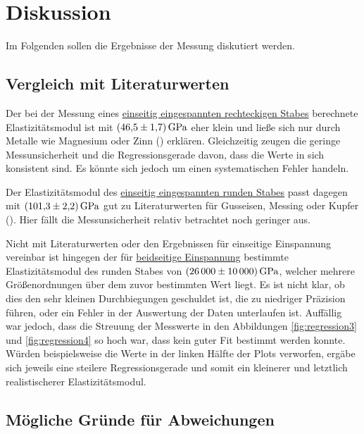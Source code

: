 \section{Diskussion}

Im Folgenden sollen die Ergebnisse der Messung diskutiert werden.

\subsection{Vergleich mit Literaturwerten}

Der bei der Messung eines \hyperref[sec:auswertung_einseitig_rechteckig]{einseitig eingespannten rechteckigen Stabes} berechnete Elastizitätsmodul ist mit $\SI{46.5 \pm 1.7}{\giga\pascal}$ eher klein und ließe sich nur durch Metalle wie Magnesium oder Zinn (\cite{e_moduln_tabelle}) erklären. Gleichzeitig zeugen die geringe Messunsicherheit und die Regressionsgerade davon, dass die Werte in sich konsistent sind. Es könnte sich jedoch um einen systematischen Fehler handeln.

Der Elastizitätsmodul des \hyperref[sec:auswertung_einseitig_rund]{einseitig eingespannten runden Stabes} passt dagegen mit $\SI{101.3 \pm 2.2}{\giga\pascal}$ gut zu Literaturwerten für Gusseisen, Messing oder Kupfer (\cite{e_moduln_tabelle}). Hier fällt die Messunsicherheit relativ betrachtet noch geringer aus.

Nicht mit Literaturwerten oder den Ergebnissen für einseitige Einspannung vereinbar ist hingegen der für \hyperref[sec:auswertung_beidseitig_rund]{beidseitige Einspannung} bestimmte Elastizitätsmodul des runden Stabes von $\SI{26000 \pm 10000}{\giga\pascal}$, welcher mehrere Größenordnungen über dem zuvor bestimmten Wert liegt. Es ist nicht klar, ob dies den sehr kleinen Durchbiegungen geschuldet ist, die zu niedriger Präzision führen, oder ein Fehler in der Auswertung der Daten unterlaufen ist. Auffällig war jedoch, dass die Streuung der Messwerte in den Abbildungen \ref{fig:regression3} und \ref{fig:regression4} so hoch war, dass kein guter Fit bestimmt werden konnte. Würden beispielsweise die Werte in der linken Hälfte der Plots verworfen, ergäbe sich jeweils eine steilere Regressionsgerade und somit ein kleinerer und letztlich realistischerer Elastizitätsmodul.

\subsection{Mögliche Gründe für Abweichungen}

